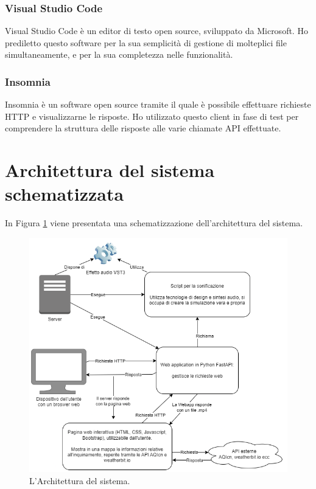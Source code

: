 \subsubsection{Visual Studio Code}
Visual Studio Code è un editor di testo open source, sviluppato da Microsoft.
Ho prediletto questo software per la sua semplicità di gestione di molteplici file simultaneamente, e per la sua completezza nelle funzionalità.
\subsubsection{Insomnia}
Insomnia è un software open source tramite il quale è possibile effettuare richieste HTTP e visualizzarne le risposte.
Ho utilizzato questo client in fase di test per comprendere la struttura delle risposte alle varie chiamate API effettuate.

\newpage
\section{Architettura del sistema schematizzata}
In Figura \ref{fig:uml} viene presentata una schematizzazione dell'architettura del sistema.
\begin{figure}[H]
    \includegraphics[width=\linewidth]{img/uml.png}
    \caption{L'Architettura del sistema.}
    \label{fig:uml}
\end{figure}